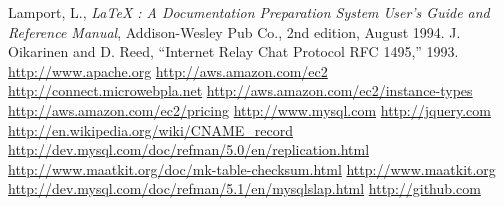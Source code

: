\documentclass[12pt]{article}
\begin{document}
\begin{thebibliography}{99} 
 Lamport, L., {\it LaTeX : A
Documentation Preparation System User's Guide and Reference Manual},
Addison-Wesley Pub Co., 2nd edition, August 1994.  
 J. Oikarinen and D. Reed, “Internet Relay Chat Protocol RFC 1495,” 1993.  
 \url{http://www.apache.org} 
  \url{http://aws.amazon.com/ec2}
  \url{http://connect.microwebpla.net} 
 \url{http://aws.amazon.com/ec2/instance-types}
\url{http://aws.amazon.com/ec2/pricing} 
 \url{http://www.mysql.com} 
 \url{http://jquery.com}
 \url{http://en.wikipedia.org/wiki/CNAME\_record}
 \url{http://dev.mysql.com/doc/refman/5.0/en/replication.html} 
 \url{http://www.maatkit.org/doc/mk-table-checksum.html} 
 \url{http://www.maatkit.org} 
 \url{http://dev.mysql.com/doc/refman/5.1/en/mysqlslap.html} 
 \url{http://github.com} 
\end{thebibliography} 
\end{document}
